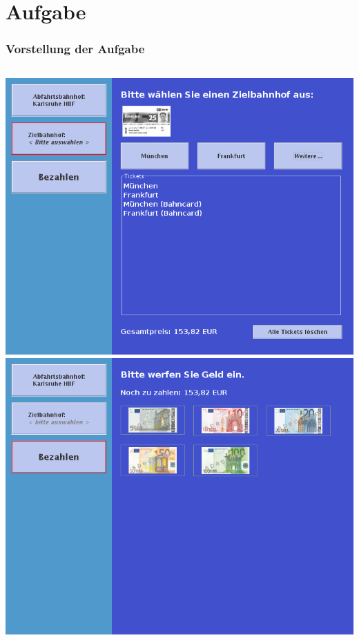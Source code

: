 \documentclass[final]{beamer}
\begin{document}
\section{Aufgabe}
\begin{frame}
	\frametitle{Vorstellung der Aufgabe}
	\begin{columns}[T]
			\includegraphics[width=\textwidth]{gfx/bahnticketautomat_buchen}
			\includegraphics[width=\textwidth]{gfx/bahnticketautomat_bezahlen}
	\end{columns}
	\vspace{\baselineskip}

\end{frame}
\end{document}

